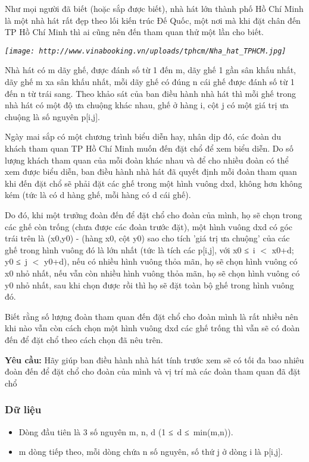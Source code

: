 



Như mọi người đã biết (hoặc sắp được biết), nhà hát lớn thành phố Hồ Chí Minh là một nhà hát rất đẹp theo lối kiến trúc Đế Quốc, một nơi mà khi đặt chân đến TP Hồ Chí Minh thì ai cũng nên đến tham quan thử một lần cho biết.

\emph{
\texttt{[image: http://www.vinabooking.vn/uploads/tphcm/Nha\_hat\_TPHCM.jpg]}}

   Nhà hát có m dãy ghế, được đánh số từ 1 đến m, dãy ghế 1 gần sân khấu nhất, dãy ghế m xa sân khấu nhất, mỗi dãy ghế có đúng n cái ghế được đánh số từ 1 đến n từ trái sang. Theo khảo sát của ban điều hành nhà hát thì mỗi ghế trong nhà hát có một độ ưa chuộng khác nhau, ghế ở hàng i, cột j có một giá trị ưa chuộng là số nguyên p[i,j].  

   Ngày mai sắp có một chương trình biểu diễn hay, nhân dịp đó, các đoàn du khách tham quan TP Hồ Chí Minh muốn đến đặt chổ để xem biểu diễn. Do số lượng khách tham quan của mỗi đoàn khác nhau và để cho nhiều đoàn có thể xem được biểu diễn, ban điều hành nhà hát đã quyết định mỗi đoàn tham quan khi đến đặt chổ sẽ phải đặt các ghế trong một hình vuông dxd, không hơn không kém (tức là có d hàng ghế, mỗi hàng có d cái ghế).  

   Do đó, khi một trưởng đoàn đến để đặt chổ cho đoàn của mình, họ sẽ chọn trong các ghế còn trống (chưa được các đoàn trước đặt), một hình vuông dxd có góc trái trên là (x0,y0) - (hàng x0, cột y0) sao cho tích 'giá trị ưa chuộng' của các ghế trong hình vuông đó là lớn nhất (tức là tích các p[i,j], với x0 ≤ i $<$ x0+d; y0 ≤ j $<$ y0+d), nếu có nhiều hình vuông thỏa mãn, họ sẽ chọn hình vuông có x0 nhỏ nhất, nếu vẫn còn nhiều hình vuông thỏa mãn, họ sẽ chọn hình vuông có y0 nhỏ nhất, sau khi chọn được rồi thì họ sẽ đặt toàn bộ ghế trong hình vuông đó.  

   Biết rằng số lượng đoàn tham quan đến đặt chổ cho đoàn mình là rất nhiều nên khi nào vẫn còn cách chọn một hình vuông dxd các ghế trống thì vẫn sẽ có đoàn đến để đặt chổ theo cách chọn đã nêu trên.  

\textbf{    Yêu cầu:   }   Hãy giúp ban điều hành nhà hát tính trước xem sẽ có tối đa bao nhiêu đoàn đến để đặt chổ cho đoàn của mình và vị trí mà các đoàn tham quan đã đặt chổ  

\subsubsection{   Dữ liệu  }
\begin{itemize}
	\item     Dòng đầu tiên là 3 số nguyên m, n, d (1 ≤ d ≤ min(m,n)).   
	\item     m dòng tiếp theo, mỗi dòng chứa n số nguyên, số thứ j ở dòng i là p[i,j].   
\end{itemize}

